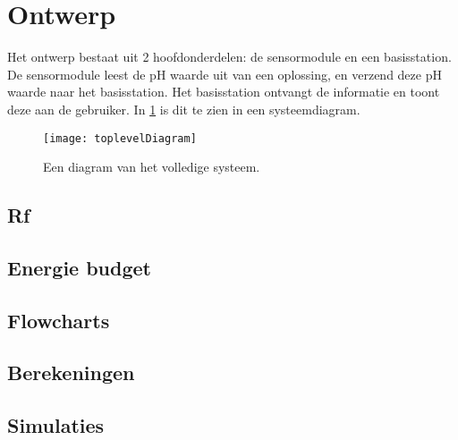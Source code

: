 \section{Ontwerp}
Het ontwerp bestaat uit 2 hoofdonderdelen: de sensormodule en een basisstation. De sensormodule leest de pH waarde uit van een oplossing, en verzend deze pH waarde naar het basisstation. Het basisstation ontvangt de informatie en toont deze aan de gebruiker.
In \cref{fig:functional} is dit te zien in een systeemdiagram.

\begin{figure}[ht]
    \centering
    \texttt{[image: toplevelDiagram]}
    \caption[short]{Een diagram van het volledige systeem.}
    \label{fig:functional}
\end{figure}




\subsection{Rf}

\subsection{Energie budget}

\subsection{Flowcharts}
\subsection{Berekeningen}
\subsection{Simulaties}




%
